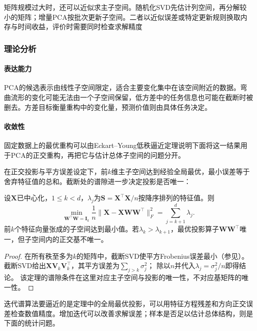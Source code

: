 矩阵规模过大时，还可以近似求主子空间。随机化SVD先估计列空间，再分解较小的矩阵；增量PCA按批次更新子空间。二者以近似误差或特定更新规则换取内存与时间收益，评价时需要同时检查求解精度

\subsubsection{理论分析}
\label{sec:dim-pca-theory}

\paragraph{表达能力}
PCA的候选表示由线性子空间限定，适合主要变化集中在该空间附近的数据。弯曲流形的变化可能无法由一个子空间保留，低方差中的任务信息也可能在截断时被删去。方差目标衡量重构中的变化量，预测价值则由具体任务决定。

\paragraph{收敛性}

固定数据上的最优重构可以由Eckart--Young低秩逼近定理说明下面将这一结果用于PCA的正交重构，再把它与估计总体子空间的问题分开。

在正交投影与平方误差设定下，前$k$维主子空间达到经验全局最优，最小误差等于舍弃特征值的总和。截断处的谱隙进一步决定投影是否唯一：

\begin{theorem}[PCA的最优线性重构性质]
  \label{thm:dim-pca-optimal}
  设$\bm{X}$已中心化，$1\leq k<d$，$\lambda_j$为$\bm{S}=\bm{X}^{\top}\bm{X}/n$按降序排列的特征值。则
  \[
    \min_{\bm{W}^{\top}\bm{W}=\bm{I}_k}
       \frac1n\lVert\bm{X}-\bm{X}\bm{W}\bm{W}^{\top}\rVert_F^2
       =\sum_{j=k+1}^{d}\lambda_j.
  \]
  前$k$个特征向量张成的子空间达到最小值。若$\lambda_k>\lambda_{k+1}$，最优投影算子$\bm{W}\bm{W}^{\top}$唯一，但子空间内的正交基不唯一。
\end{theorem}

\begin{proof}
在所有秩至多为$k$的矩阵中，截断SVD使平方Frobenius误差最小（参见）。
截断SVD给出$\bm X\bm V_k\bm V_k^\top$，其平方误差为$\sum_{j>k}\sigma_j^2$；
除以$n$并代入$\lambda_j=\sigma_j^2/n$即得结论。
该定理的谱隙条件在这里对应主子空间与投影的唯一性，不对应基矩阵的唯一性。
\end{proof}

迭代谱算法要逼近的是定理中的全局最优投影，可以用特征方程残差和方向正交误差检查数值精度。增加迭代可以改善求解误差；样本是否足以估计总体结构，则是下面的统计问题。

